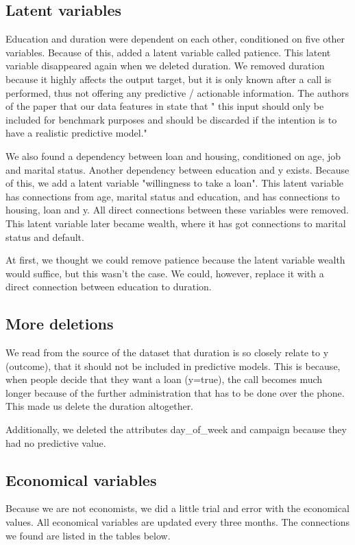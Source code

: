 \documentclass[11pt]{article}
\begin{document}
\begin{multicols}{2}
\subsection{Latent variables}
Education and duration were dependent on each other, conditioned on five other
variables. Because of this, added a latent variable called patience. This latent
variable disappeared again when we deleted duration. We removed duration because
it highly affects the output target, but it is only known after a call is
performed, thus not offering any predictive / actionable information.  The
authors of the paper that our data features in state that " this input should
only be included for benchmark purposes and should be discarded if the intention
is to have a realistic predictive model."

We also found a dependency between loan and housing, conditioned on age, job and
marital status. Another dependency between education and y exists. Because of
this, we add a latent variable "willingness to take a loan". This latent
variable has connections from age, marital status and education, and has
connections to housing, loan and y. All direct connections between these
variables were removed. This latent variable later became wealth, where it has
got connections to marital status and default. 

At first, we thought we could remove patience because the latent variable wealth
would suffice, but this wasn't the case. We could, however, replace it with a
direct connection between education to duration. 

\subsection{More deletions}
We read from the source of the dataset that duration is so closely relate to y (outcome), that it should not be included in predictive models. This is because,
when people decide that they want a loan (y=true), the call becomes much longer
because of the further administration that has to be done over the phone. This
made us delete the duration altogether. 

Additionally, we deleted the attributes day\_of\_week and campaign because they had no predictive value. 

\subsection{Economical variables}
Because we are not economists, we did a little trial and error with the
economical values. All economical variables are updated every three months. The
connections we found are listed in the tables below. 


\end{multicols}
\end{document}
